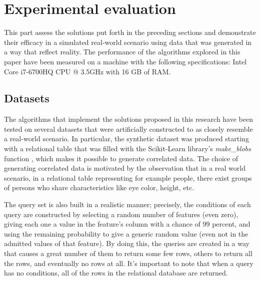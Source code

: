 \section{Experimental evaluation} 
\label{experimental_evalutation}
This part assess the solutions put forth in the preceding sections and demonstrate their efficacy in a simulated real-world scenario using data that was generated in a way that reflect reality. The performance of the algorithms explored in this paper have been measured on a machine with the following  specifications: Intel Core i7-6700HQ CPU @ 3.5GHz with 16 GB of RAM.


\subsection{Datasets}
The algorithms that implement the solutions proposed in this research have been tested on several datasets that were artificially constructed to as closely resemble a real-world scenario.
In particular, the synthetic dataset was produced starting with a relational table that was filled with the Scikit-Learn library's \emph{make\_blobs} function \cite{scikit-learn}, which makes it possible to generate correlated data. The choice of generating correlated data is motivated by the observation that in a real world scenario, in a relational table representing for example people, there exist groups of persons who share characteristics like eye color, height, etc. 

The query set is also built in a realistic manner; precisely, the conditions of each query are constructed by selecting a random number of features (even zero), giving each one a value in the feature's column with a chance of $99$ percent, and using the remaining probability to give a generic random value (even not in the admitted values of that feature). By doing this, the queries are created in a way that causes a great number of them to return some few rows, others to return all the rows, and eventually no rows at all. It's important to note that when a query has no conditions, all of the rows in the relational database are returned. 

